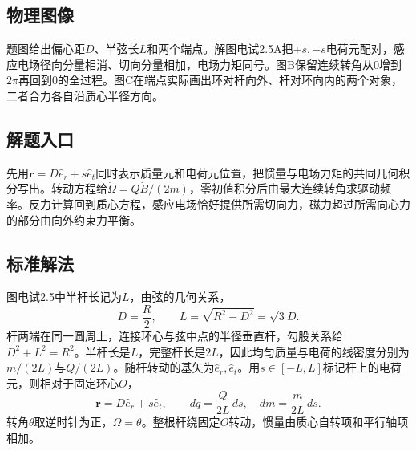 \documentclass[UTF8,fontset=fandol,a4paper,11pt]{ctexart}
\begin{document}


\subsection*{物理图像}

题图给出偏心距$D$、半弦长$L$和两个端点。解图电试2.5A把$+s,-s$电荷元配对，感应电场径向分量相消、切向分量相加，电场力矩同号。图B保留连续转角从0增到$2\pi$再回到0的全过程。图C在端点实际画出环对杆向外、杆对环向内的两个对象，二者合力各自沿质心半径方向。



\subsection*{解题入口}

先用$\boldsymbol r=D\hat e_r+s\hat e_t$同时表示质量元和电荷元位置，把惯量与电场力矩的共同几何积分写出。转动方程给$\dot\Omega=Q\dot B/(2m)$，零初值积分后由最大连续转角求驱动频率。反力计算回到质心方程，感应电场恰好提供所需切向力，磁力超过所需向心力的部分由向外约束力平衡。



\subsection*{标准解法}


图电试2.5中半杆长记为$L$，由弦的几何关系，
\[
D=\frac R2,\qquad L=\sqrt{R^2-D^2}=\sqrt3D.
\]
杆两端在同一圆周上，连接环心与弦中点的半径垂直杆，勾股关系给$D^2+L^2=R^2$。半杆长是$L$，完整杆长是$2L$，因此均匀质量与电荷的线密度分别为$m/(2L)$与$Q/(2L)$。随杆转动的基矢为$\hat e_r,\hat e_t$。用$s\in[-L,L]$标记杆上的电荷元，则相对于固定环心$O$，
\[
\boldsymbol r=D\hat e_r+s\hat e_t,\qquad
dq=\frac Q{2L}\,ds,\quad dm=\frac m{2L}\,ds.
\]
转角$\theta$取逆时针为正，$\Omega=\dot\theta$。整根杆绕固定$O$转动，惯量由质心自转项和平行轴项相加。
\end{document}
